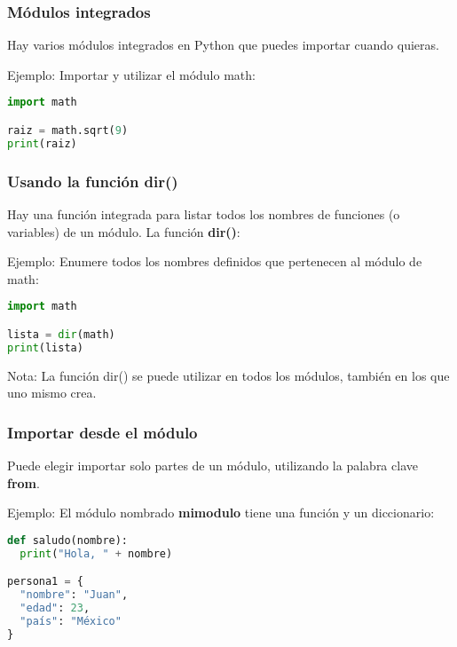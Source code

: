\begin{frame}[fragile]
  \frametitle{Módulos integrados}
  Hay varios módulos integrados en Python que puedes importar cuando quieras.

  \begin{exampleblock}{Ejemplo:}
    Importar y utilizar el módulo math:
    \begin{lstlisting}[language=Python]
import math

raiz = math.sqrt(9)
print(raiz)
    \end{lstlisting}
  \end{exampleblock}
\end{frame}

\begin{frame}[fragile]
  \frametitle{Usando la función dir()}
  Hay una función integrada para listar todos los nombres de
  funciones (o variables) de un módulo. La función \textbf{dir()}:
  \begin{exampleblock}{Ejemplo:}
    Enumere todos los nombres definidos que pertenecen al módulo de math:
    \begin{lstlisting}[language=Python]
import math

lista = dir(math)
print(lista)
    \end{lstlisting}
  \end{exampleblock}
  \begin{block}{Nota:}
    La función dir() se puede utilizar en todos los módulos,
    también en los que uno mismo crea.
  \end{block}
\end{frame}

\begin{frame}[fragile]
  \frametitle{Importar desde el módulo}
  Puede elegir importar solo partes de un módulo,
  utilizando la palabra clave \textbf{from}.
  \begin{exampleblock}{Ejemplo:}
    El módulo nombrado \textbf{mimodulo} tiene una función y un diccionario:
    \begin{lstlisting}[language=Python]
def saludo(nombre):
  print("Hola, " + nombre)

persona1 = {
  "nombre": "Juan",
  "edad": 23,
  "país": "México"
}
    \end{lstlisting}
  \end{exampleblock}
\end{frame}

